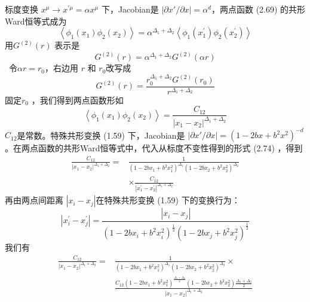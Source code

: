 标度变换 $x^{\mu} \rightarrow x^{\prime \mu}=\alpha x^{\mu}$ 下，Jacobian是 $|\partial x'/\partial x|=\alpha^d $，两点函数 (2.69) 的共形Ward恒等式成为
\begin{equation}
	\left\langle\phi_{1}\left(x_{1}\right) \phi_{2}\left(x_{2}\right)\right\rangle=\alpha^{\Delta_{1}+\Delta_{2}}\left\langle\phi_{1}\left(x_{1}^{\prime}\right) \phi_{2}\left(x_{2}^{\prime}\right)\right\rangle
\end{equation}
用$ G^{(2)}(r)$ 表示是
\begin{equation}
	G^{(2)}(r)=\alpha^{\Delta_{1}+\Delta_{2}} G^{(2)}(\alpha r)
\end{equation}\
令$\alpha r=r_0 $，右边用 $r$ 和 $r_0 $改写成
\begin{equation}
	G^{(2)}(r)=\frac{r_{0}^{\Delta_{1}+\Delta_{2}} G^{(2)}\left(r_{0}\right)}{r^{\Delta_{1}+\Delta_{2}}}
\end{equation}
固定$ r_0$ ，我们得到两点函数形如
\begin{equation}
	\left\langle\phi_{1}\left(x_{1}\right) \phi_{2}\left(x_{2}\right)\right\rangle=\frac{C_{12}}{\left|x_{1}-x_{2}\right|^{\Delta_{1}+\Delta_{2}}}
\end{equation}
$C_{12} $是常数。特殊共形变换 (1.59) 下，Jacobian是 $|\partial x'/\partial x|=\left(1-2 b x+b^{2} x^{2}\right)^{-d}$ 。在两点函数的共形Ward恒等式中，代入从标度不变性得到的形式 (2.74) ，得到
\begin{equation}
	\begin{aligned} \frac{C_{12}}{\left|x_{1}-x_{2}\right|^{\Delta_{1}+\Delta_{2}}}=& \frac{1}{\left(1-2 b x_{1}+b^{2} x_{1}^{2}\right)^{\Delta_{1}}\left(1-2 b x_{2}+b^{2} x_{2}^{2}\right)^{\Delta_{2}}} \\ & \times \frac{C_{12}}{\left|x_{1}^{\prime}-x_{2}^{\prime}\right|^{\Delta_{1}+\Delta_{2}}} \end{aligned}
\end{equation}
再由两点间距离 $|x_i-x_j| $在特殊共形变换 (1.59) 下的变换行为：
\begin{equation}
	\left|x_{i}^{\prime}-x_{j}^{\prime}\right|=\frac{\left|x_{i}-x_{j}\right|}{\left(1-2 b x_{i}+b^{2} x_{i}^{2}\right)^{\frac{1}{2}}\left(1-2 b x_{j}+b^{2} x_{j}^{2}\right)^{\frac{1}{2}}}
\end{equation}
我们有
\begin{equation}
	\begin{aligned} \frac{C_{12}}{\left|x_{1}-x_{2}\right|^{\Delta_{1}+\Delta_{2}}}=& \frac{1}{\left(1-2 b x_{1}+b^{2} x_{1}^{2}\right)^{\Delta_{1}}\left(1-2 b x_{2}+b^{2} x_{2}^{2}\right)^{\Delta_{2}}} \times \\ & \frac{C_{12}\left(1-2 b x_{1}+b^{2} x_{1}^{2}\right)^{\frac{\Delta_{1}+\Delta_{2}}{2}}\left(1-2 b x_{2}+b^{2} x_{2}^{2}\right) \frac{\Delta_{1}+\Delta_{2}}{2}}{\left|x_{1}-x_{2}\right|^{\Delta_{1}+\Delta_{2}}} \end{aligned}
\end{equation}
